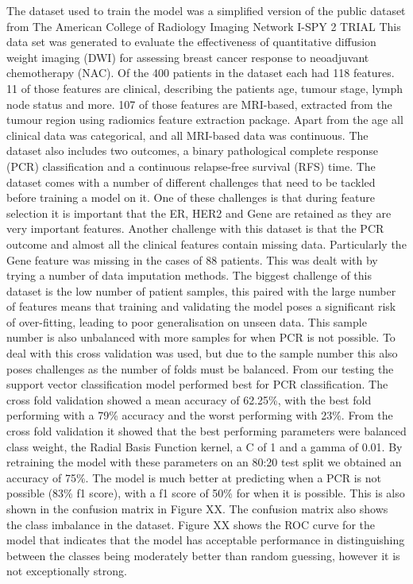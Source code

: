 \documentclass{article}
\begin{document}
The dataset used to train the model was a simplified version of the public dataset from The American College of Radiology Imaging Network I-SPY 2 TRIAL \cite{newitt2021acr} This data set was generated to evaluate the effectiveness of quantitative diffusion weight imaging (DWI) for assessing breast cancer response to neoadjuvant chemotherapy (NAC). Of the 400 patients in the dataset each had 118 features. 11 of those features are clinical, describing the patients age, tumour stage, lymph node status and more. 107 of those features are MRI-based, extracted from the tumour region using radiomics feature extraction package. Apart from the age all clinical data was categorical, and all MRI-based data was continuous. The dataset also includes two outcomes, a binary pathological complete response (PCR) classification and a continuous relapse-free survival (RFS) time.
The dataset comes with a number of different challenges that need to be tackled before training a model on it. One of these challenges is that during feature selection it is important that the ER, HER2 and Gene are retained as they are very important features. Another challenge with this dataset is that the PCR outcome and almost all the clinical features contain missing data. Particularly the Gene feature was missing in the cases of 88 patients. This was dealt with by trying a number of data imputation methods. The biggest challenge of this dataset is the low number of patient samples, this paired with the large number of features means that training and validating the model poses a significant risk of over-fitting, leading to poor generalisation on unseen data. This sample number is also unbalanced with more samples for when PCR is not possible. To deal with this cross validation was used, but due to the sample number this also poses challenges as the number of folds must be balanced.
From our testing the support vector classification model performed best for PCR classification. The cross fold validation showed a mean accuracy of 62.25\%, with the best fold performing with a 79\% accuracy and the worst performing with 23\%. From the cross fold validation it showed that the best performing parameters were balanced class weight, the Radial Basis Function kernel, a C of 1 and a gamma of 0.01. By retraining the model with these parameters on an 80:20 test split we obtained an accuracy of 75\%. The model is much better at predicting when a PCR is not possible (83\% f1 score), with a f1 score of 50\% for when it is possible. This is also shown in the confusion matrix in Figure XX. The confusion matrix also shows the class imbalance in the dataset. Figure XX shows the ROC curve for the model that indicates that the model has acceptable performance in distinguishing between the classes being moderately better than random guessing, however it is not exceptionally strong.
\end{document}
